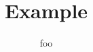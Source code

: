 \documentclass{article}
\begin{document}
\title{Example}
\author{foo}
\maketitle
\Blinddocument
\end{document}
